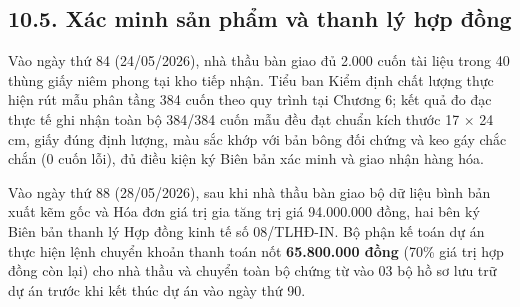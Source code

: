 \subsection{10.5. Xác minh sản phẩm và thanh lý hợp đồng}

Vào ngày thứ 84 (24/05/2026), nhà thầu bàn giao đủ 2.000 cuốn tài liệu trong 40 thùng giấy niêm phong tại kho tiếp nhận. Tiểu ban Kiểm định chất lượng thực hiện rút mẫu phân tầng 384 cuốn theo quy trình tại Chương 6; kết quả đo đạc thực tế ghi nhận toàn bộ 384/384 cuốn mẫu đều đạt chuẩn kích thước 17 $\times$ 24 cm, giấy đúng định lượng, màu sắc khớp với bản bông đối chứng và keo gáy chắc chắn (0 cuốn lỗi), đủ điều kiện ký Biên bản xác minh và giao nhận hàng hóa.

Vào ngày thứ 88 (28/05/2026), sau khi nhà thầu bàn giao bộ dữ liệu bình bản xuất kẽm gốc và Hóa đơn giá trị gia tăng trị giá 94.000.000 đồng, hai bên ký Biên bản thanh lý Hợp đồng kinh tế số 08/TLHĐ-IN. Bộ phận kế toán dự án thực hiện lệnh chuyển khoản thanh toán nốt \textbf{65.800.000 đồng} (70\% giá trị hợp đồng còn lại) cho nhà thầu và chuyển toàn bộ chứng từ vào 03 bộ hồ sơ lưu trữ dự án trước khi kết thúc dự án vào ngày thứ 90.

